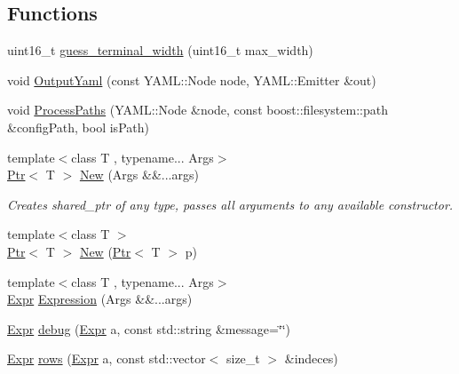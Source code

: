 \subsection*{Functions}
\begin{DoxyCompactItemize}
\item 
uint16\+\_\+t \hyperlink{namespacemarian_aa656da9ccb3e53462fef9b9745616b57}{guess\+\_\+terminal\+\_\+width} (uint16\+\_\+t max\+\_\+width)
\item 
void \hyperlink{namespacemarian_a4017daa42159d6a6465637380fb81bbf}{Output\+Yaml} (const Y\+A\+M\+L\+::\+Node node, Y\+A\+M\+L\+::\+Emitter \&out)
\item 
void \hyperlink{namespacemarian_a88f36a7ce9ef4d686bb5e31220481d96}{Process\+Paths} (Y\+A\+M\+L\+::\+Node \&node, const boost\+::filesystem\+::path \&config\+Path, bool is\+Path)
\item 
{\footnotesize template$<$class T , typename... Args$>$ }\\\hyperlink{namespacemarian_ad1a373be43a00ef9ce35666145137b08}{Ptr}$<$ T $>$ \hyperlink{namespacemarian_afe55543784336e96f224f9d88206d1fb}{New} (Args \&\&...args)
\begin{DoxyCompactList}\small\item\em Creates shared\+\_\+ptr of any type, passes all arguments to any available constructor. \end{DoxyCompactList}\item 
{\footnotesize template$<$class T $>$ }\\\hyperlink{namespacemarian_ad1a373be43a00ef9ce35666145137b08}{Ptr}$<$ T $>$ \hyperlink{namespacemarian_a8b5635e6b01553e78bfab781201e5d12}{New} (\hyperlink{namespacemarian_ad1a373be43a00ef9ce35666145137b08}{Ptr}$<$ T $>$ p)
\item 
{\footnotesize template$<$class T , typename... Args$>$ }\\\hyperlink{namespacemarian_a498d8baf75b754011078b890b39c8e12}{Expr} \hyperlink{namespacemarian_ad462a1e871db086ba7e97c6d3abdef34}{Expression} (Args \&\&...args)
\item 
\hyperlink{namespacemarian_a498d8baf75b754011078b890b39c8e12}{Expr} \hyperlink{namespacemarian_a442bfa469f081af4c2665c341efc71ce}{debug} (\hyperlink{namespacemarian_a498d8baf75b754011078b890b39c8e12}{Expr} a, const std\+::string \&message=\char`\"{}\char`\"{})
\item 
\hyperlink{namespacemarian_a498d8baf75b754011078b890b39c8e12}{Expr} \hyperlink{namespacemarian_ace1e9a63d52edc363d70d661cf8d0257}{rows} (\hyperlink{namespacemarian_a498d8baf75b754011078b890b39c8e12}{Expr} a, const std\+::vector$<$ size\+\_\+t $>$ \&indeces)

\end{DoxyCompactItemize}
